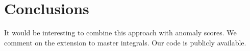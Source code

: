 \section{Conclusions}\label{sec:conclusions}

It would be interesting to combine this approach with anomaly scores. We
comment on the extension to master integrals. Our code is publicly
available.

